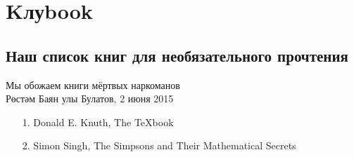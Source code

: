 \section*{Kлуbook} 
\subsection*{Наш список книг для необязательного прочтения} %
\begin{epigraph}
    Мы обожаем книги мёртвых наркоманов\\
    {\normalfont Рөстәм Баян улы Булатов, 2 июня 2015}
\end{epigraph}

\begin{itemize}
        \item[1.] Donald E. Knuth, The {\TeX}book
        \item[2.] Simon Singh, The Simpsons and Their Mathematical Secrets
\end{itemize}
